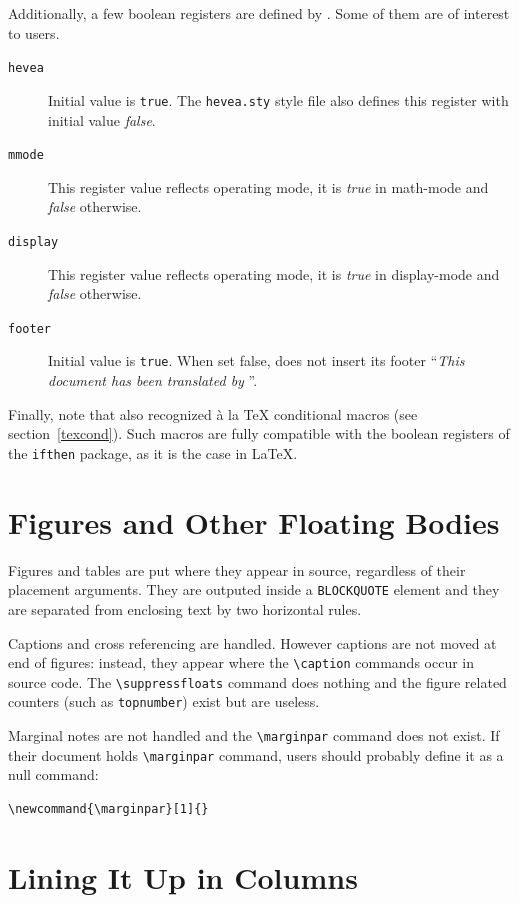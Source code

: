 Additionally, a few boolean registers are defined by \hevea{}.
Some of them are of interest to users.
\begin{description}
\item[\texttt{hevea}] Initial value is \texttt{true}.
The \texttt{hevea.sty} style file also defines this register with
initial value \textit{false}.
\item[\texttt{mmode}] This register value reflects \hevea{} operating
mode, it is \textit{true} in math-mode and \textit{false} otherwise.
\item[\texttt{display}]  This register value reflects \hevea{} operating
mode, it is \textit{true} in display-mode and \textit{false} otherwise.
\item[\texttt{footer}] Initial value is  \texttt{true}.
When set false, \hevea{} does not insert its footer ``\emph{This
document has been translated by \hevea}''.

\end{description}

Finally, note that \hevea{} also recognized \`a la \TeX{} conditional
macros (see section~\ref{texcond}). Such macros are fully compatible
with the boolean registers of the \texttt{ifthen} package, as it is
the case in \LaTeX.


\section{Figures and Other Floating Bodies}

Figures and tables are put where they appear in source, regardless of
their placement arguments.
They are outputed  inside a \verb+BLOCKQUOTE+ element and they are
separated from enclosing text by two
horizontal rules.

Captions and cross referencing are handled.
However captions are not moved at end of figures: instead, they appear
where the \verb+\caption+ commands occur in source code.
The \verb+\suppressfloats+ command does nothing and the
figure related counters (such as \verb+topnumber+) exist but are useless.

Marginal notes are not handled and the \verb+\marginpar+ command does
not exist.
If their document holds \verb+\marginpar+ command, users should
probably define it as a null command:
\begin{verbatim}
\newcommand{\marginpar}[1]{}
\end{verbatim}

\section{Lining It Up in Columns}
